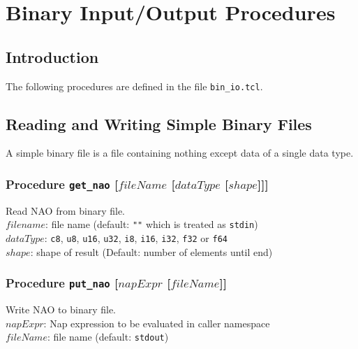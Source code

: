 
\section{Binary Input/Output Procedures}
    \label{bin-io}

\subsection{Introduction}
    \label{bin-io-Introduction}

    The following procedures are defined in the file 
  \texttt{bin\_io.tcl}.

\subsection{Reading and Writing Simple Binary Files}
    \label{bin-io-Simple-Binary-Files}

    A simple binary file is a file containing nothing except data of
  a single data type.

\subsubsection{Procedure
\texttt{get\_nao} [$\mathit{fileName}$ [$\mathit{dataType}$ [$\mathit{shape}$]]]}
    \label{bin-io-get-nao}

  Read NAO from binary file.
  \\
  $\mathit{filename}$: file name (default: 
  \texttt{""} which is treated as 
  \texttt{stdin})
  \\
  $\mathit{dataType}$: 
  \texttt{c8}, 
  \texttt{u8}, 
  \texttt{u16}, 
  \texttt{u32}, 
  \texttt{i8}, 
  \texttt{i16}, 
  \texttt{i32}, 
  \texttt{f32} or 
  \texttt{f64}
  \\
  $\mathit{shape}$: shape of result (Default: number of elements until
  end)

\subsubsection{Procedure \texttt{put\_nao} [$napExpr$ [$\mathit{fileName}$]]}
    \label{bin-io-put-nao}

  Write NAO to binary file.
  \\
  $napExpr$: Nap expression to be evaluated in caller
  namespace
  \\
  $\mathit{fileName}$: file name (default: 
  \texttt{stdout})

